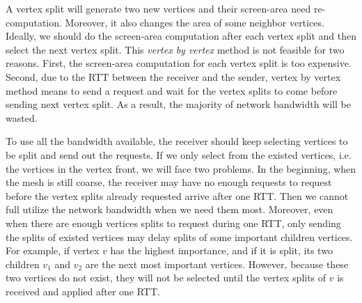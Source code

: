     A vertex split will generate two new vertices and their screen-area need re-computation.
    Moreover, it also changes the area of some neighbor vertices. Ideally, we should 
    do the screen-area computation after each vertex split and then select the next 
    vertex split. This \emph{vertex by vertex} method is not feasible for two reasons.
    First, the screen-area computation for each vertex split is too expensive. Second,
    due to the RTT between the receiver and the sender, vertex by vertex method means
    to send a request and wait for the vertex splits to come before sending next vertex
    split. As a result, the majority of network bandwidth will be wasted. 
    
    To use all the bandwidth available, the receiver should keep selecting vertices to be split
    and send out the requests. If we only select from the existed vertices, i.e. 
    the vertices in the vertex front, we will face two problems.
    In the beginning, when the mesh is still coarse, the receiver may have no enough requests
    to request before the vertex splits already requested arrive after one RTT. 
    Then we cannot full utilize the network bandwidth when we need them most.
    Moreover, even when there are enough vertices splits to request during one RTT, only sending
    the splits of existed vertices may delay splits of some important children vertices.
    For example, if vertex $v$ has the highest importance, and if it is split, its two 
    children $v_1$ and $v_2$ are the next most important vertices. However, because these
    two vertices do not exist, they will not be selected until the vertex splits of $v$ 
    is received and applied after one RTT.

